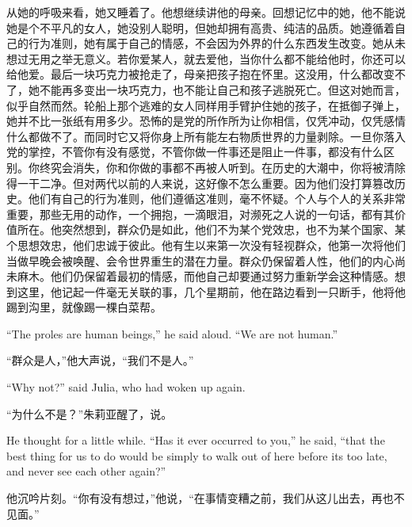 \begin{paracol}{2}
\switchcolumn

从她的呼吸来看，她又睡着了。他想继续讲他的母亲。回想记忆中的她，他不能说她是个不平凡的女人，她没别人聪明，但她却拥有高贵、纯洁的品质。她遵循着自己的行为准则，她有属于自己的情感，不会因为外界的什么东西发生改变。她从未想过无用之举无意义。若你爱某人，就去爱他，当你什么都不能给他时，你还可以给他爱。最后一块巧克力被抢走了，母亲把孩子抱在怀里。这没用，什么都改变不了，她不能再多变出一块巧克力，也不能让自己和孩子逃脱死亡。但这对她而言，似乎自然而然。轮船上那个逃难的女人同样用手臂护住她的孩子，在抵御子弹上，她并不比一张纸有用多少。恐怖的是党的所作所为让你相信，仅凭冲动，仅凭感情什么都做不了。而同时它又将你身上所有能左右物质世界的力量剥除。一旦你落入党的掌控，不管你有没有感觉，不管你做一件事还是阻止一件事，都没有什么区别。你终究会消失，你和你做的事都不再被人听到。在历史的大潮中，你将被清除得一干二净。但对两代以前的人来说，这好像不怎么重要。因为他们没打算篡改历史。他们有自己的行为准则，他们遵循这准则，毫不怀疑。个人与个人的关系非常重要，那些无用的动作，一个拥抱，一滴眼泪，对濒死之人说的一句话，都有其价值所在。他突然想到，群众仍是如此，他们不为某个党效忠，也不为某个国家、某个思想效忠，他们忠诚于彼此。他有生以来第一次没有轻视群众，他第一次将他们当做早晚会被唤醒、会令世界重生的潜在力量。群众仍保留着人性，他们的内心尚未麻木。他们仍保留着最初的情感，而他自己却要通过努力重新学会这种情感。想到这里，他记起一件毫无关联的事，几个星期前，他在路边看到一只断手，他将他踢到沟里，就像踢一棵白菜帮。

\switchcolumn*

``The proles are human beings,'' he said aloud. ``We are not human.''

\switchcolumn

``群众是人，''他大声说，``我们不是人。''

\switchcolumn*

``Why not?'' said Julia, who had woken up again.

\switchcolumn

``为什么不是？''朱莉亚醒了，说。

\switchcolumn*

He thought for a little while. ``Has it ever occurred to you,'' he said,
``that the best thing for us to do would be simply to walk out of here
before it\textquotesingle s too late, and never see each other again?''

\switchcolumn

他沉吟片刻。``你有没有想过，''他说，``在事情变糟之前，我们从这儿出去，再也不见面。''

\switchcolumn*


\end{paracol}
